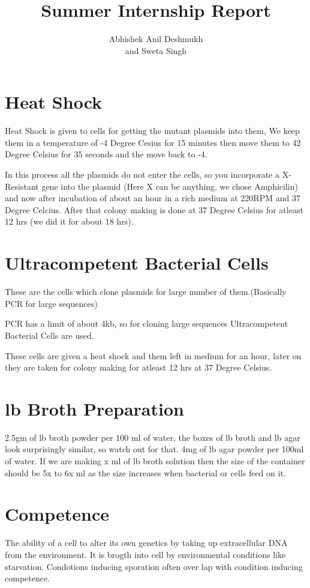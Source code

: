 \documentclass[11pt,twoside,a4paper]{article}
\author{Abhishek Anil Deshmukh\\
	and
	Sweta Singh\\}
\title{Summer Internship Report}
\begin{document}
\maketitle

\section{Heat Shock}
Heat Shock  is given to cells for getting the mutant plasmids into them, We keep them in a temperature of -4 Degree Cesius for 15 minutes then move them to 42 Degree Celsius for 35 seconds and the move back to -4.

In this process all the plasmids do not enter the cells, so you incorporate a X-Resistant gene into the plasmid (Here X can be anything, we chose Amphicilin) and now after incubation of about an hour in a rich medium at 220RPM and 37 Degree Celcius. After that colony making is done at 37 Degree Celsius for atleast 12 hrs (we did it for about 18 hrs).

\section{Ultracompetent Bacterial Cells}
These are the cells which clone plasmids for large number of them.(Basically PCR for large sequences)

PCR has a limit of about 4kb, so for cloning large sequences Ultracompetent Bacterial Cells are used.

These cells are given a heat shock and them left in medium for an hour, later on they are taken for colony making for atleast 12 hrs at 37 Degree Celsius.
\section{lb Broth Preparation}
2.5gm of lb broth powder per 100 ml of water, the boxes of lb broth and lb agar look surprisingly similar, so watch out for that. 4mg of lb agar powder per 100ml of water. If we are making x ml of lb broth solution then the size of the container should be 5x to 6x ml as the size increases when bacterial or cells feed on it.

\section{Competence}
The ability of a cell to alter its own genetics by taking up extracellular DNA from the environment. It is brogth into cell by environmental conditions like starvation. Condotions inducing sporation often over lap with condition inducing competence.
\end{document}
